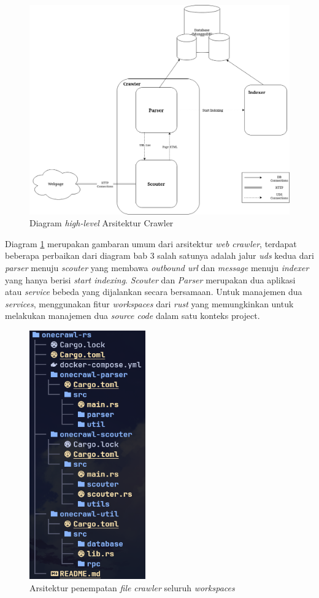 \begin{figure}[H]
  \centering
  \includegraphics[keepaspectratio, width=12cm]{gambar/high-level-arch.png}
  \caption{Diagram \emph{high-level} Arsitektur Crawler}
  \label{gambar:high_level_arch}
\end{figure}

Diagram \ref{gambar:high_level_arch} merupakan gambaran umum dari arsitektur \emph{web crawler}, terdapat beberapa perbaikan dari diagram bab 3 salah satunya adalah jalur \emph{uds} kedua dari \emph{parser} menuju \emph{scouter} yang membawa \emph{outbound url} dan \emph{message} menuju \emph{indexer} yang hanya berisi \emph{start indexing}. \emph{Scouter} dan \emph{Parser} merupakan dua aplikasi atau \emph{service} bebeda yang dijalankan secara bersamaan. Untuk manajemen dua \emph{services}, menggunakan fitur \emph{workspaces} dari \emph{rust} yang memungkinkan untuk melakukan manajemen dua \emph{source code} dalam satu konteks project.

\begin{figure}[H]
  \centering
  \includegraphics[keepaspectratio, width=5cm]{gambar/project_workspaces.png}
  \caption{Arsitektur penempatan \emph{file} \emph{crawler} seluruh \emph{workspaces}}
  \label{gambar:project_workspaces_arch}
\end{figure}

